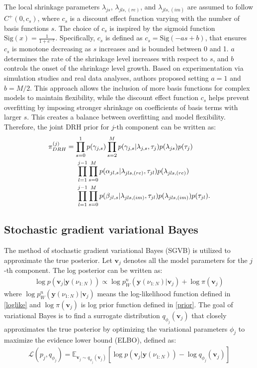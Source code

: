 \documentclass[12pt,a4paper]{article}
\begin{document}
The local shrinkage parameters $\lambda_{js}$, $\lambda_{jls,(re)}$, and $\lambda_{jls,(im)}$ are assumed to follow $C^+(0,c_s)$, where $c_s$ is a discount effect function varying with the number of basis functions $s$. The choice of $c_s$ is inspired by the sigmoid function $\text{Sig}(x) = \frac{1}{1+e^{-x}}$. Specifically, $c_s$ is defined as $c_s = \text{Sig}(-as + b)$, that ensures $c_s$ is monotone decreasing as $s$ increases and is bounded between 0 and 1. $a$ determines the rate of the shrinkage level increases with respect to $s$, and $b$ controls the onset of the shrinkage level growth. Based on experimentation via simulation studies and real data analyses, authors proposed setting $a = 1$ and $b = M/2$. This approach allows the inclusion of more basis functions for complex models to maintain flexibility, while the discount effect function $c_s$ helps prevent overfitting by imposing stronger shrinkage on coefficients of basis terms with larger $s$. This creates a balance between overfitting and model flexibility. Therefore, the joint DRH prior for $j$-th component can be written as:
\begin{align}
\begin{split}
\pi_{DRH}^{(j)} &= \prod_{s=0}^{1}p(\gamma_{j,s})\prod_{s=2}^{M}p(\gamma_{j,s}|\lambda_{j,s},\tau_j)p(\lambda_{js})p(\tau_j)
\\& \hspace{0.2in}\prod_{l=1}^{j-1}\prod_{s=0}^{M}p(\alpha_{jl,s}|\lambda_{jls,(re)},\tau_{jl})p(\lambda_{jls,(re)})
\\&\hspace{0.2in}\prod_{l=1}^{j-1}\prod_{s=0}^{M}p(\beta_{jl,s}|\lambda_{jls,(im)},\tau_{jl})p(\lambda_{jls,(im)})p(\tau_{jl}).
\end{split}
\label{prior}
\end{align}

\subsection{Stochastic gradient variational Bayes}
\label{sgvb}
The method of stochastic gradient variational Bayes (SGVB) is utilized to approximate the true posterior. Let $\mathbf{v}_j$ denotes all the model parameters for the $j$-th component. The log posterior can be written as:
\begin{align}
\log p(\mathbf{v}_j|\mathbf{y}(\nu_{1:N})) \propto \log p^{n}_W(\mathbf{y}(\nu_{1:N})| \mathbf{v}_j) + \log \pi(\mathbf{v}_j)
\end{align}
where $\log p^{n}_W(\mathbf{y}(\nu_{1:N})| \mathbf{v}_j)$ means the log-likelihood function defined in \eqref{loglike} and $\log \pi(\mathbf{v}_j)$ is log prior function defined in \eqref{prior}. The goal of variational Bayes is to find a surrogate distribution $q_{\phi_j}(\mathbf{v}_j)$ that closely approximates the true posterior by optimizing the variational parameters $\phi_j$ to maximize the evidence lower bound (ELBO), defined as:
\begin{align*}
\mathcal{L}(p_j,q_{\phi_j}) = \mathbb{E}_{\mathbf{v}_j \sim q_{\phi_j}(\mathbf{v}_j)} \left[\log p(\mathbf{v}_j|\mathbf{y}(\nu_{1:N})) - \log q_{\phi_j}(\mathbf{v}_j) \right]
\end{align*}
\end{document}
